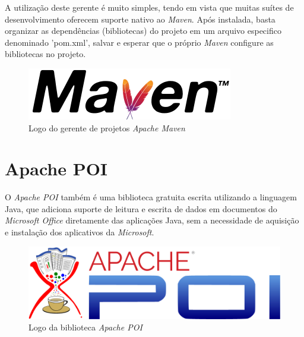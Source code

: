 \documentclass[
	12pt,			%
	openright,		%
	oneside,	
	a4paper,		%
	english,		%
	brazil			%
]{abntex2/abntex2}  %
\begin{document}
			A utilização deste gerente é muito simples, tendo em vista que muitas suítes de desenvolvimento oferecem suporte nativo ao \textit{Maven}. Após instalada, basta organizar as dependências (bibliotecas) do projeto em um arquivo especifico denominado 'pom.xml', salvar e esperar que o próprio \textit{Maven} configure as bibliotecas no projeto.
			
			\begin{figure}[ht]
				\begin{center}
					
					\caption{Logo do gerente de projetos \textit{Apache Maven}}
					\includegraphics[scale=0.45]{img/maven-logo}
					
				\end{center}
			\end{figure}
		
		\section{Apache POI}
		
			O \textit{Apache POI} \cite{poi} também é uma biblioteca gratuita escrita utilizando a linguagem Java, que adiciona suporte de leitura e escrita de dados em documentos do \textit{Microsoft Office} diretamente das aplicações Java, sem a necessidade de aquisição e instalação dos aplicativos da \textit{Microsoft}.
			
			\begin{figure}[ht]
				\begin{center}
					
					\caption{Logo da biblioteca \textit{Apache POI}}
					\includegraphics[scale=0.3]{img/apache-poi}
					
				\end{center}
			\end{figure}
		
\end{document}
